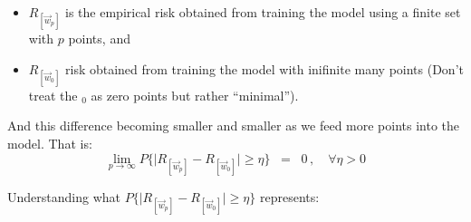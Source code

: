 \begin{frame}\frametitle{\subsecname}\label{sec:convergence_erm}
			
			
			\begin{itemize}
			\item $R_{[\vec w_p]}$ is the empirical risk obtained from training the model using a finite set with $p$ points, and
			\item $R_{[\vec w_0]}$ risk obtained from training the model with inifinite many points (Don't treat the $_0$ as zero points but rather ``minimal'').
			\end{itemize}
			
			And this difference becoming smaller and smaller as we feed more points into the model. That is:
			\begin{equation}
				\lim_{p \to \infty} P\bigg\{ 
					{
						\Big|R_{[\vec w_p]} - R_{[\vec w_0]}\Big| 
					}
				\geq \eta \bigg\}\;\;=\;\; 0 \,, \quad \forall \eta > 0
				\label{eq:erm_converges_zero}
			\end{equation}
			
			Understanding what $P\bigg\{ 
					{
						\Big|R_{[\vec w_p]} - R_{[\vec w_0]}\Big| 
					}
				\geq \eta \bigg\}$ represents:
			

\end{frame}

